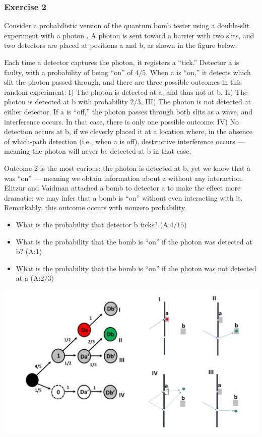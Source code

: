 \documentclass[
]{book}
\begin{document}
\hypertarget{exercise-2-1}{%
\subsubsection{Exercise 2}\label{exercise-2-1}}

Consider a probabilistic version of the quantum bomb tester using a double-slit experiment with a photon \citep{Elitzur1993}. A photon is sent toward a barrier with two slits, and two detectors are placed at positions a and b, as shown in the figure below.

Each time a detector captures the photon, it registers a ``tick.'' Detector a is faulty, with a probability of being ``on'' of \(4/5\). When a is ``on,'' it detects which slit the photon passed through, and there are three possible outcomes in this random experiment: I) The photon is detected at a, and thus not at b, II) The photon is detected at b with probability \(2/3\), III) The photon is not detected at either detector. If a is ``off,'' the photon passes through both slits as a wave, and interference occurs. In that case, there is only one possible outcome: IV) No detection occurs at b, if we cleverly placed it at a location where, in the absence of which-path detection (i.e., when a is off), destructive interference occurs --- meaning the photon will never be detected at b in that case.

Outcome 2 is the most curious: the photon is detected at b, yet we know that a was ``on'' --- meaning we obtain information about a without any interaction. Elitzur and Vaidman attached a bomb to detector a to make the effect more dramatic: we may infer that a bomb is ``on'' without even interacting with it. Remarkably, this outcome occurs with nonzero probability.

\begin{itemize}
\item
  What is the probability that detector b ticks? (A:\(4/15\))
\item
  What is the probability that the bomb is ``on'' if the photon was detected at b? (A:\(1\))
\item
  What is the probability that the bomb is ``on'' if the photon was not detected at a (A:\(2/3\))
\end{itemize}

\includegraphics{./figures/quantum.jpg}
\end{document}

